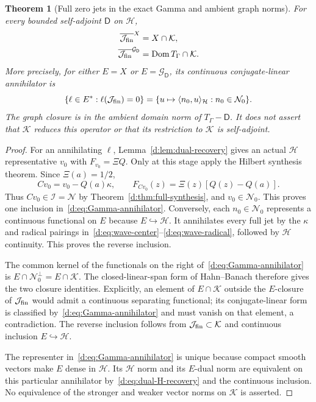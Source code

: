 \documentclass[11pt,a4paper]{article}
\numberwithin{equation}{section}
\newtheorem{theorem}{Theorem}[section]
\theoremstyle{definition}\newtheorem{definition}[theorem]{Definition}
\theoremstyle{remark}\newtheorem{remark}[theorem]{Remark}
\newcommand{\Hh}{\mathcal H}\newcommand{\Hw}{\mathcal H}
\newcommand{\ip}[2]{\langle#1,#2\rangle}\newcommand{\norm}[1]{\lVert#1\rVert}\newcommand{\abs}[1]{\lvert#1\rvert}
\newcommand{\Nn}{\mathcal N}\newcommand{\Ii}{\mathcal I}\newcommand{\Zz}{\mathcal Z}
\newcommand{\Kk}{\mathcal K}\newcommand{\Aa}{\mathcal A}\newcommand{\Ff}{\mathcal F}
\begin{document}
\begin{theorem}[Full zero jets in the exact Gamma and ambient graph norms]\label{d:thm:Gamma-jet-core}
For every bounded self-adjoint $\mathsf D$ on $\Hh$,
\begin{align}
 \overline{\mathcal J_{\rm fin}}^{{X}}
   &={X}\cap\Kk,\label{d:eq:Gamma-form-jet-core}\\
 \overline{\mathcal J_{\rm fin}}^{\mathcal G_{\mathsf D}}
   &=\operatorname{Dom}T_\Gamma\cap\Kk.
 \label{d:eq:Gamma-graph-jet-core}
\end{align}
More precisely, for either $E={X}$ or $E=\mathcal G_{\mathsf D}$, its continuous conjugate-linear annihilator is
\begin{equation}\label{d:eq:Gamma-annihilator}
 \{\ell\in E^*: \ell(\mathcal J_{\rm fin})=0\}
 =\{u\mapsto\ip{n_0}{u}_{\Hh}:n_0\in\Nn_0\}.
\end{equation}
The graph closure is in the ambient domain norm of $T_\Gamma-\mathsf D$. It does not assert that $\Kk$ reduces this operator or that its restriction to $\Kk$ is self-adjoint.
\end{theorem}
\begin{proof}
For an annihilating $\ell$, Lemma~\ref{d:lem:dual-recovery} gives an actual $\Hh$ representative $v_0$ with $F_{v_0}=\Xi Q$. Only at this stage apply the Hilbert synthesis theorem. Since $\Xi(a)=1/2$,
\[
 Cv_0=v_0-Q(a)\kappa,\qquad
 F_{Cv_0}(z)=\Xi(z)[Q(z)-Q(a)].
\]
Thus $Cv_0\in\Ii=\Nn$ by Theorem~\ref{d:thm:full-synthesis}, and $v_0\in\Nn_0$. This proves one inclusion in~\eqref{d:eq:Gamma-annihilator}. Conversely, each $n_0\in\Nn_0$ represents a continuous functional on $E$ because $E\hookrightarrow\Hh$. It annihilates every full jet by the $\kappa$ and radical pairings in~\eqref{d:eq:wave-center}--\eqref{d:eq:wave-radical}, followed by $\Hh$ continuity. This proves the reverse inclusion.

The common kernel of the functionals on the right of~\eqref{d:eq:Gamma-annihilator} is $E\cap\Nn_0^\perp=E\cap\Kk$. The closed-linear-span form of Hahn--Banach therefore gives the two closure identities. Explicitly, an element of $E\cap\Kk$ outside the $E$-closure of $\mathcal J_{\rm fin}$ would admit a continuous separating functional; its conjugate-linear form is classified by~\eqref{d:eq:Gamma-annihilator} and must vanish on that element, a contradiction. The reverse inclusion follows from $\mathcal J_{\rm fin}\subset\Kk$ and continuous inclusion $E\hookrightarrow\Hh$.

The representer in~\eqref{d:eq:Gamma-annihilator} is unique because compact smooth vectors make $E$ dense in $\Hh$. Its $\Hh$ norm and its $E$-dual norm are equivalent on this particular annihilator by~\eqref{d:eq:dual-H-recovery} and the continuous inclusion. No equivalence of the stronger and weaker vector norms on $\Kk$ is asserted.
\end{proof}
\end{document}
